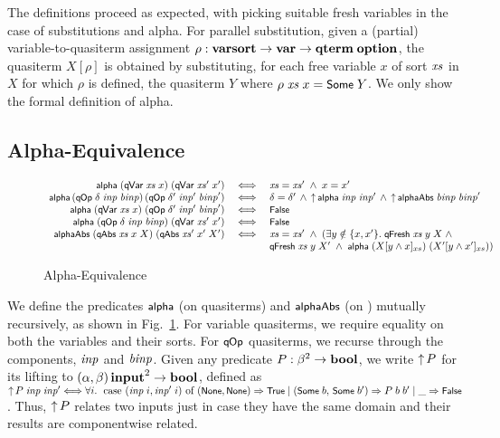 \documentclass{llncs}
\begin{document}
The definitions proceed as expected, with picking suitable fresh 
variables in the case of substitutions and alpha. For parallel substitution, 
given a 
(partial) variable-to-quasiterm assignment $\rho: \varsort \ra \var \ra \qterm\;\option$, 
the quasiterm $X[\rho]$ is obtained by substituting, 
for each free variable $x$ of sort $\xs$ in $X$ for which $\rho$ is defined, the quasiterm $Y$ where  
$\rho\;\xs\;x = \Some\;Y$. 
%
We only show the formal definition of alpha. 



\subsection{Alpha-Equivalence}
\label{subsec-alpha}

\begin{figure}[t]
\hspace*{-1ex}
{\footnotesize
$
\begin{array}{rcl}
\al\;(\qVar\;\xs\;x)\;(\qVar\;\xs'\;x') &\iff&
   \xs = \xs' \;\wedge\; x = x'
\\
\al\,(\qOp\;\delta\;\inp\;\binp)\,(\qOp\;\delta'\;\inp'\;\binp') &\;\iff\;&
   \delta = \delta' \,\wedge\, \lift\,\al\;\inp\;\inp' \,\wedge\, \lift\,\alAbs\;\binp\;\binp' 
\\
\al\;(\qVar\;\xs\;x)\;(\qOp\;\delta'\;\inp'\;\binp') &\iff&
   \Ffalse
\\
\al\;(\qOp\;\delta\;\inp\;\binp)\;(\qVar\;\xs'\;x') &\iff&
   \Ffalse
\\
\alAbs\;(\qAbs\;\xs\;x\;X)\;(\qAbs\;\xs'\;x'\;X')  &\iff&
    \xs = \xs' \;\wedge\;(\exists y \notin \{x,x'\}.\;\qFresh\;\xs\;y\;X \;\wedge\;
\\
&&
 \qFresh\;\xs\;y\;X' \;\wedge\; \al\;(X [ y \wedge x]_{xs})\;(X' [ y \wedge x']_{xs}))
\end{array}
$
}
\vspace*{-2ex} %
\caption{Alpha-Equivalence} %
\label{fig-alpha}
\vspace*{-4ex}
\end{figure}


We define the %
predicates $\al$ (on quasiterms) and $\alAbs$ (on \abstractions{}) 
mutually recursively, as shown in Fig.~\ref{fig-alpha}.  For variable quasiterms, we require %
equality on both the variables and their sorts. For $\qOp$ quasiterms, we %
recurse through the components, $\inp$ and $\binp$. Given any predicate $P : \beta^2 \ra \bool$, we write 
$\lift\,P$ for its lifting to $(\alpha,\beta)\,\inputt^2 \ra \bool$, 
defined as $\lift\,P\;\inp\;\inp' \iff \forall i.\;\mbox{ case }(\inp\;i,\inp'\;i) \mbox{ of } 
(\None,\None) \allowbreak \Ra \Ttrue \mid(\Some\;b,\,\Some\;b') \Ra P\;b\;b' \mid\_ \Ra \Ffalse$.
Thus, $\lift\,P$ relates two inputs  
just in case they have the same domain and their %
results are componentwise 
related.
\end{document}
